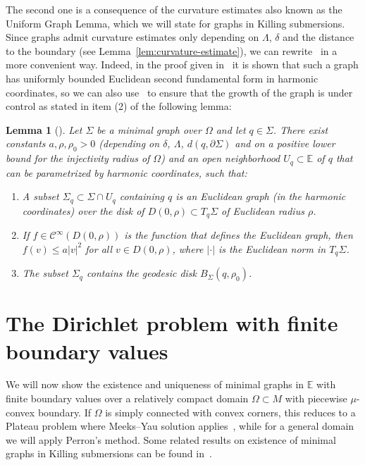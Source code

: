 \documentclass[a4paper,10pt,reqno]{amsart}
\newcommand{\E}{\mathbb{E}}
\newtheorem{lemma}[theorem]{Lemma}
\theoremstyle{definition}
\theoremstyle{remark}
\numberwithin{equation}{section}
\begin{document}
The second one is a consequence of the curvature estimates also known as the Uniform Graph Lemma, which we will state for graphs in Killing submersions. Since graphs admit curvature estimates only depending on $\Lambda$, $\delta$ and the distance to the boundary (see Lemma~\ref{lem:curvature-estimate}), we can rewrite~\cite[Prop.~4.3]{RST} in a more convenient way. Indeed, in the proof given in~\cite{RST} it is shown that such a graph has uniformly bounded Euclidean second fundamental form in harmonic coordinates, so we can also use~\cite[Lemma~4.1.1]{PerezRos} to ensure that the growth of the graph is under control as stated in item (2) of the following lemma:

\begin{lemma}[{\cite[Prop.~4.3]{RST}}]\label{lem:uniform-graph-lemma}
Let $\Sigma$ be a minimal graph over $\Omega$ and let $q\in\Sigma$. There exist constants $a,\rho,\rho_0>0$ (depending on $\delta$, $\Lambda$, $d(q,\partial\Sigma)$ and on a positive lower bound for the injectivity radius of $\Omega$) and an open neighborhood $U_q\subset\E$ of $q$ that can be parametrized by harmonic coordinates, such that:
\begin{enumerate}[label=\emph{(\arabic*)}]
	\item A subset $\Sigma_q\subset\Sigma\cap U_q$ containing $q$ is an Euclidean graph (in the harmonic coordinates) over the disk of $D(0,\rho)\subset T_q\Sigma$ of Euclidean radius $\rho$.
	\item If $f\in\mathcal C^\infty(D(0,\rho))$ is the function that defines the Euclidean graph, then $f(v)\leq a|v|^2$ for all $v\in D(0,\rho)$, where $|\cdot|$ is the Euclidean norm in $T_q\Sigma$.
	\item The subset $\Sigma_q$ contains the geodesic disk $B_\Sigma(q,\rho_0)$.
\end{enumerate}
\end{lemma}


\section{The Dirichlet problem with finite boundary values}\label{sec:dirichlet}

We will now show the existence and uniqueness of minimal graphs in $\E$ with finite boundary values over a relatively compact domain $\Omega\subset M$ with piecewise $\mu$-convex boundary. If $\Omega$ is simply connected with convex corners, this reduces to a Plateau problem where Meeks--Yau solution applies~\cite{MY1}, while for a general domain we will apply Perron's method. Some related results on existence of minimal graphs in Killing submersions can be found in~\cite{ADR,DD,DDR,KM}.
\end{document}
